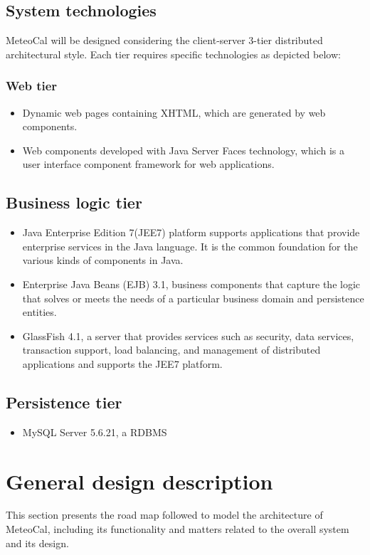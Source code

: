 \documentclass[10pt,a4paper,titlepage]{article}
\begin{document}
\subsection{System technologies}
MeteoCal will be designed considering the client-server 3-tier distributed architectural style. Each tier requires specific technologies as depicted below:

\subsubsection{Web tier}
\begin{itemize}
\item Dynamic web pages containing XHTML, which are generated by web components.
\item Web components developed with Java Server Faces technology, which is a user interface component framework for web applications.
\end{itemize}

\subsection{Business logic tier}
\begin{itemize}
\item Java Enterprise Edition 7(JEE7) platform supports applications that provide enterprise services in the Java language. It is the common foundation for the various kinds of components in Java.
\item Enterprise Java Beans (EJB) 3.1, business components that capture the logic that solves or meets the needs of a particular business domain and persistence entities.
\item GlassFish 4.1, a server that provides services such as security, data services, transaction support, load balancing, and management of distributed applications and supports the JEE7 platform.
\end{itemize}

\subsection{Persistence tier}
\begin{itemize}
\item MySQL Server 5.6.21, a RDBMS
\end{itemize}

\section{General design description}
This section presents the road map followed to model the architecture of MeteoCal, including its functionality and matters related to the overall system and its design.
\end{document}
